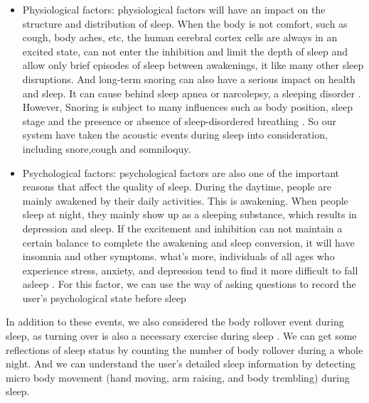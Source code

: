 \begin{itemize}
  \item Physiological factors: physiological factors will have an impact on the structure and distribution of sleep. When the body is not comfort, such as cough, body aches, etc, the human cerebral cortex cells are always in an excited state, can not enter the inhibition and limit the depth of sleep and allow only brief episodes of sleep between awakenings, it like many other sleep disruptions. And long-term snoring can also have a serious impact on health and sleep. It can cause behind sleep apnea or narcolepsy, a sleeping disorder \cite{snoring2016,snoring2013}. However, Snoring is subject to many influences such as body position, sleep stage and the presence or absence of sleep-disordered breathing \cite{snoring2010}. So our system have taken the acoustic events during sleep into consideration, including snore,cough and somniloquy.
  \item Psychological factors: psychological factors are also one of the important reasons that affect the quality of sleep. During the daytime, people are mainly awakened by their daily activities. This is awakening. When people sleep at night, they mainly show up as a sleeping substance, which results in depression and sleep. If the excitement and inhibition can not maintain a certain balance to complete the awakening and sleep conversion, it will have insomnia and other symptoms. what's more, individuals of all ages who experience stress, anxiety, and depression tend to find it more difficult to fall asleep \cite{mood2003,light2007,mood2015}. For this factor, we can use the way of asking questions to record the user's psychological state before sleep
\end{itemize}

In addition to these events, we also considered the body rollover event during sleep, as turning over is also a necessary exercise during
sleep \cite{rollover2014,rollover201408}. We can get some reflections of sleep status by counting the number of body rollover during a
whole night. And we can understand the user's detailed sleep information by detecting  micro body movement (hand moving, arm raising, and
body trembling) during sleep.

